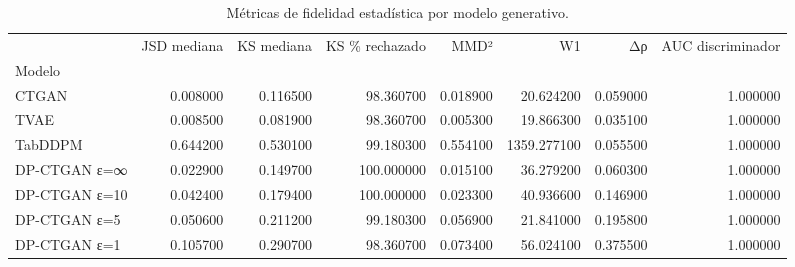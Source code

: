 \begin{table}
\caption{Métricas de fidelidad estadística por modelo generativo.}
\label{tab:fidelidad_summary}
\begin{tabular}{lrrrrrrr}
\toprule
 & JSD mediana & KS mediana & KS \% rechazado & MMD² & W1 & Δρ & AUC discriminador \\
Modelo &  &  &  &  &  &  &  \\
\midrule
CTGAN & 0.008000 & 0.116500 & 98.360700 & 0.018900 & 20.624200 & 0.059000 & 1.000000 \\
TVAE & 0.008500 & 0.081900 & 98.360700 & 0.005300 & 19.866300 & 0.035100 & 1.000000 \\
TabDDPM & 0.644200 & 0.530100 & 99.180300 & 0.554100 & 1359.277100 & 0.055500 & 1.000000 \\
DP-CTGAN ε=∞ & 0.022900 & 0.149700 & 100.000000 & 0.015100 & 36.279200 & 0.060300 & 1.000000 \\
DP-CTGAN ε=10 & 0.042400 & 0.179400 & 100.000000 & 0.023300 & 40.936600 & 0.146900 & 1.000000 \\
DP-CTGAN ε=5 & 0.050600 & 0.211200 & 99.180300 & 0.056900 & 21.841000 & 0.195800 & 1.000000 \\
DP-CTGAN ε=1 & 0.105700 & 0.290700 & 98.360700 & 0.073400 & 56.024100 & 0.375500 & 1.000000 \\
\bottomrule
\end{tabular}
\end{table}
